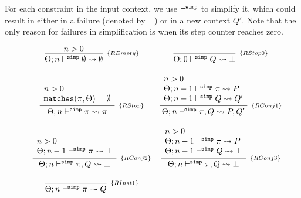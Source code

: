 \documentclass[a4paper, 11pt]{article}
\theoremstyle{definition}
\begin{document}
For each constraint in the input context, we use $\vdash^{\mathtt{simp}}$ to 
simplify it, which could result in either in a failure (denoted 
by $\bot$) or in a new context $ Q'$. Note that the only reason for failures in 
simplification is when its step counter reaches zero.

\begin{figure}[H] 
  \[
    \begin{array}{cc}
      \infer[_{\{REmpty\}}]
            {\Theta ; n \simp \emptyset \leadsto \emptyset}
            {n > 0}
      & 
      \infer[_{\{RStop0\}}] 
            {\Theta ; 0 \simp Q \leadsto \bot} 
            {} 
      \\ \\ 
      \infer[_{\{RStop\}}]
            {\Theta ; n \simp \pi \leadsto \pi} 
            {\begin{array}{l}
              n > 0 \\
              \mathtt{matches}(\pi,\Theta) = \emptyset
             \end{array}}
      & 
      \infer[_{\{RConj1\}}]
            {\Theta ; n \simp \pi, Q \leadsto P, Q'}
            {\begin{array}{l}
              n > 0 \\ 
              \Theta ; n - 1 \simp \pi \leadsto P \\ 
              \Theta ; n - 1 \simp Q \leadsto Q'
             \end{array}}
      \\ \\ 
      \infer[_{\{RConj2\}}]
            {\Theta ; n \simp \pi, Q \leadsto \bot}
            {\begin{array}{l}
              n > 0 \\ 
              \Theta ; n - 1 \simp \pi \leadsto \bot \\ 
             \end{array}}
      & 
      \infer[_{\{RConj3\}}]
            {\Theta ; n \simp \pi, Q \leadsto \bot}
            {\begin{array}{l}
              n > 0 \\ 
              \Theta ; n - 1 \simp \pi \leadsto P \\ 
              \Theta ; n - 1 \simp Q \leadsto \bot 
             \end{array}}
      \\ \\
      \infer[_{\{RInst1\}}]
            {\Theta ; n \simp \pi \leadsto Q}
            {\begin{array}{l}

\end{array}}
\end{array}\]
\end{figure}
\end{document}

